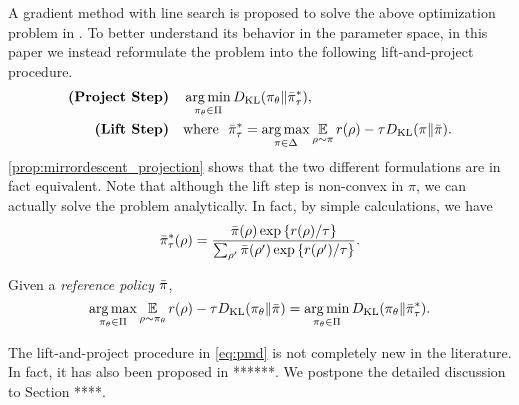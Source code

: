A gradient method with line search is proposed to solve the above optimization problem in \citet{schulman2015trust}. 
To better understand its behavior in the parameter space, in this paper we instead reformulate the problem into the following lift-and-project procedure.
\begin{equation}
\label{eq:pmd}
\begin{split}
\text{\bf (Project Step)} \quad &\operatorname*{arg\,min}\limits_{\pi_\theta \in \Pi}{D_{\mathrm{KL}}( \pi_\theta \| \bar{\pi}_{\tau}^* )}, \\
\text{\bf (Lift Step)}  \quad & \text{where}\ \ \bar{\pi}_{\tau}^* =  \operatorname*{arg\,max}\limits_{\pi \in \Delta}{ \operatorname*{\mathbb{E}}\limits_{\rho \sim \pi}{  r(\rho)  - \tau D_{\mathrm{KL}}(\pi \| \bar{\pi}) } }. 
\end{split}
\end{equation}
\cref{prop:mirrordescent_projection} shows that the two different formulations are in fact equivalent.
Note that although the lift step is non-convex in $\pi$, we can actually solve the problem analytically. In fact, by simple calculations, we have 
\begin{equation}
\label{eq:pitaustar}
\bar{\pi}_\tau^*(\rho) =  \frac{\bar{\pi}(\rho) \exp\left\{ r(\rho) / \tau \right\}}{ \sum_{\rho^{\prime}}{\bar{\pi}(\rho^{\prime}) \exp\left\{ r(\rho^{\prime}) / \tau \right\} } }.
\end{equation}
\begin{prop}
\label{prop:mirrordescent_projection}
Given a \emph{reference policy} $\bar{\pi}$,
\[
 \operatorname*{arg\,max}\limits_{\pi_\theta \in \Pi} { \operatorname*{\mathbb{E}}\limits_{\rho \sim \pi_\theta}{  r(\rho)  - \tau D_{\mathrm{KL}}(\pi_\theta \| \bar{\pi}) } } 
 = \operatorname*{arg\,min}\limits_{\pi_\theta \in \Pi}{ D_{\mathrm{KL}}(\pi_\theta \| \bar{\pi}_\tau^*) }.
\]
\end{prop}
\begin{remk}
	The lift-and-project procedure in \cref{eq:pmd} is not completely new in the literature. In fact, it has also been proposed in ******. We postpone the detailed discussion to Section ****.
\end{remk}
